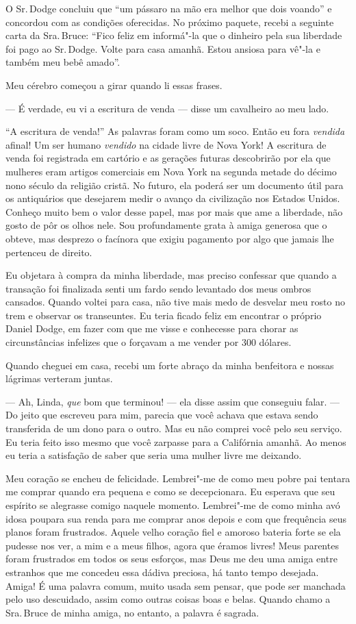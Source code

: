 O Sr.\,Dodge concluiu que ``um pássaro
na mão era melhor que dois voando'' e concordou com as condições
oferecidas. No próximo paquete, recebi a seguinte carta da Sra.\,Bruce:
``Fico feliz em informá"-la que o dinheiro pela sua liberdade foi pago ao
Sr.\,Dodge. Volte para casa amanhã. Estou ansiosa para vê"-la e também meu
bebê amado''.

Meu cérebro começou a girar quando li
essas frases.

--- É verdade, eu vi a escritura de venda --- disse um cavalheiro ao meu
lado.

``A escritura de venda!'' As palavras foram como um soco. Então eu fora
\emph{vendida} afinal! Um ser humano \emph{vendido} na cidade livre de
Nova York! A escritura de venda foi registrada em cartório e as gerações
futuras descobrirão por ela que mulheres eram artigos comerciais em Nova
York na segunda metade do décimo nono século da religião cristã. No
futuro, ela poderá ser um documento útil para os antiquários que
desejarem medir o avanço da civilização nos Estados Unidos. Conheço
muito bem o valor desse papel, mas por mais que ame a liberdade, não
gosto de pôr os olhos nele. Sou profundamente grata à amiga generosa que
o obteve, mas desprezo o facínora que exigiu pagamento por algo que
jamais lhe pertenceu de direito.

Eu objetara à compra da minha
liberdade, mas preciso confessar que quando a transação foi finalizada
senti um fardo sendo levantado dos meus ombros cansados. Quando voltei
para casa, não tive mais medo de desvelar meu rosto no trem e observar
os transeuntes. Eu teria ficado feliz em encontrar o próprio Daniel
Dodge, em fazer com que me visse e conhecesse para chorar as
circunstâncias infelizes que o forçavam a me vender por 300 dólares.

Quando cheguei em casa, recebi um forte
abraço da minha benfeitora e nossas lágrimas verteram juntas.

--- Ah, Linda, \emph{que} bom que terminou! --- ela disse assim que
conseguiu falar. --- Do jeito que escreveu para mim, parecia que você
achava que estava sendo transferida de um dono para o outro. Mas eu não
comprei você pelo seu serviço. Eu teria feito isso mesmo que você
zarpasse para a Califórnia amanhã. Ao menos eu teria a satisfação de
saber que seria uma mulher livre me deixando.

Meu coração se encheu de felicidade.
Lembrei"-me de como meu pobre pai tentara me comprar quando era pequena e
como se decepcionara. Eu esperava que seu espírito se alegrasse comigo
naquele momento. Lembrei"-me de como minha avó idosa poupara sua renda
para me comprar anos depois e com que frequência seus planos foram
frustrados. Aquele velho coração fiel e amoroso bateria forte se ela
pudesse nos ver, a mim e a meus filhos, agora que éramos livres! Meus
parentes foram frustrados em todos os seus esforços, mas Deus me deu uma
amiga entre estranhos que me concedeu essa dádiva preciosa, há tanto
tempo desejada. Amiga! É uma palavra comum, muito usada sem pensar, que
pode ser manchada pelo uso descuidado, assim como outras coisas boas e
belas. Quando chamo a Sra.\,Bruce de minha amiga, no entanto, a palavra é
sagrada.


